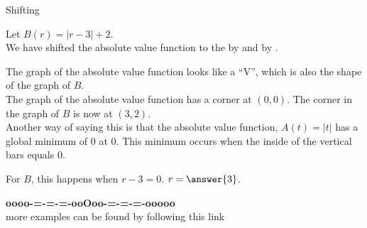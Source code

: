 \documentclass{ximera}
\begin{document}
\begin{example}  Shifting

Let $B(r) = |r-3| + 2$.  \\


We have shifted the absolute value function to the  by  and   by .


\begin{image}
\end{image}




The graph of the absolute value function looks like a ``V'', which is also the shape of the graph of $B$. \\


The graph of the absolute value function has a corner at $(0, 0)$.  The corner in the graph of $B$ is now at $(3, 2)$. \\

Another way of saying this is that the absolute value function, $A(t) = |t|$ has a global minimum of $0$ at $0$.  This minimum occurs when the inside of the vertical bars equals $0$.

For $B$, this happens when $r-3=0$. $r=\answer{3}$.



\end{example}



















\begin{center}
\textbf{\textcolor{green!50!black}{oooo-=-=-=-ooOoo-=-=-=-ooooo}} \\

more examples can be found by following this link\\ 

\end{center}
\end{document}
